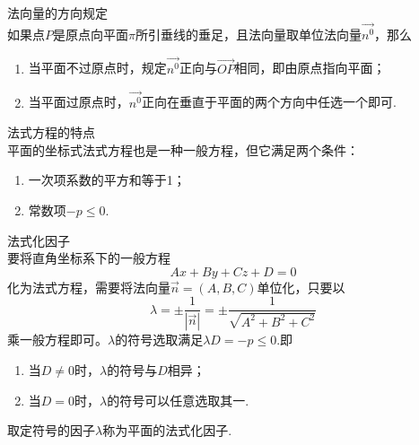 \begin{enumerate}[\large1.]
\begin{enumerate}[]
\begin{equation}
		\end{equation}
	\end{enumerate}
	{\color{dy}法向量的方向规定}\\
	\hspace*{0.7cm} 如果点$P$是原点向平面$\pi $所引垂线的垂足，且法向量取单位法向量$\overrightarrow{n^0}$，那么
	\begin{enumerate}[(1)]
		\setlength{\itemindent}{3em}
		\setlength{\topsep}{0.01em}
		\setlength{\itemsep}{0.01em}
		\item 当平面不过原点时，规定$\overrightarrow{n^0}$正向与$\overrightarrow{OP}$相同，即{\color{dl}由原点指向平面}；
		\item 当平面过原点时，$\overrightarrow{n^0}$正向在垂直于平面的两个方向中{\color{dl}任选一个}即可.
	\end{enumerate}
	{\color{dy}法式方程的特点}\\
	\hspace*{0.7cm} 平面的坐标式法式方程也是一种一般方程，但它满足两个条件：
	\begin{enumerate}[(1)]
		\setlength{\itemindent}{3em}
		\setlength{\topsep}{0.01em}
		\setlength{\itemsep}{0.01em}
		\item 一次项系数的平方和等于1；
		\item 常数项$-p \le 0$.
	\end{enumerate}
	{\color{dy}法式化因子}\\
	\hspace*{0.7cm} 要将直角坐标系下的一般方程
	\begin{equation*}
	Ax+By+Cz+D=0
	\end{equation*}
	化为法式方程，需要将法向量$\overrightarrow{n}=(A,B,C)$单位化，只要以
	\begin{equation}
	\lambda =\pm \frac{1}{|\overrightarrow{n}|}=\pm \frac{1}{\sqrt{A^2+B^2+C^2}}
	\end{equation}
	乘一般方程即可。$\lambda $的符号选取满足$\lambda D=-p \le 0.$即
	\begin{enumerate}[(1)]
		\setlength{\itemindent}{3em}
		\setlength{\topsep}{0.01em}
		\setlength{\itemsep}{0.01em}
		\item 当$D \neq 0$时，$\lambda $的符号与$D$相异；
		\item 当$D = 0$时，$\lambda $的符号可以任意选取其一.
	\end{enumerate}
	取定符号的因子$\lambda $称为平面的法式化因子.
\end{enumerate}
